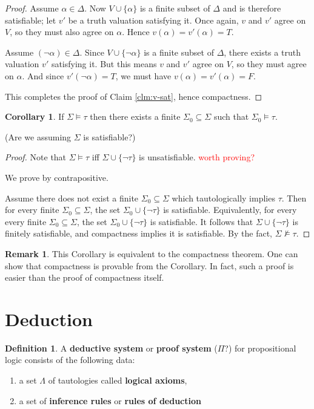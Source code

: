 \documentclass[12pt]{article}
\theoremstyle{definition}
\newtheorem{corollary}[theorem]{Corollary}
\newtheorem{definition}[theorem]{Definition}
\newtheorem{remark}[theorem]{Remark}
\newcommand{\<}{\langle}
\renewcommand{\>}{\rangle}
\newcommand{\seq}{\subseteq}
\newcommand{\keyword}{\textbf}
\begin{document}
\begin{proof}

    Assume $\alpha \in \Delta$.
    Now $V \cup \{\alpha\}$ is a finite subset of $\Delta$ and is therefore satisfiable; let $v'$ be a truth valuation satisfying it.
    Once again, $v$ and $v'$ agree on $V$, so they must also agree on $\alpha$.
    Hence $v(\alpha) = v'(\alpha) = T$.

    Assume $(\lnot\alpha) \in \Delta$.
    Since $V \cup \{\lnot\alpha\}$ is a finite subset of $\Delta$, there exists a truth valuation $v'$ satisfying it.
    But this means $v$ and $v'$ agree on $V$, so they must agree on $\alpha$.
    And since $v'(\lnot\alpha) = T$, we must have $v(\alpha) = v'(\alpha) = F$.

    This completes the proof of Claim \ref{clm:v-sat}, hence compactness.
\end{proof}


\begin{corollary}
    If $\Sigma \vDash \tau$ then there exists a finite $\Sigma_0 \seq \Sigma$ such that $\Sigma_0 \vDash \tau$.
\end{corollary}

(Are we assuming $\Sigma$ is satisfiable?)

\begin{proof}
    Note that $\Sigma \vDash \tau$ iff $\Sigma \cup \{\lnot\tau\}$ is unsatisfiable.
    \textcolor{red}{worth proving?}

    We prove by contrapositive.

    Assume there does not exist a finite $\Sigma_0 \seq \Sigma$ which tautologically implies $\tau$.
    Then for every finite $\Sigma_0 \seq \Sigma$, the set $\Sigma_0 \cup \{\lnot\tau\}$ is satisfiable.
    Equivalently, for every every finite $\Sigma_0 \seq \Sigma$, the set $\Sigma_0 \cup \{\lnot\tau\}$ is satisfiable.
    It follows that $\Sigma \cup \{\lnot\tau\}$ is finitely satisfiable, and compactness implies it is satisfiable.
    By the fact, $\Sigma \nvDash \tau$.
\end{proof}

\begin{remark}
    This Corollary is equivalent to the compactness theorem.
    One can show that compactness is provable from the Corollary.
    In fact, such a proof is easier than the proof of compactness itself.
\end{remark}

\section{Deduction}

\begin{definition}
    A \keyword{deductive system} or \keyword{proof system} ($\Pi$?) for propositional logic consists of the following data:
    \begin{enumerate}
        \item a set $\Lambda$ of tautologies called \keyword{logical axioms},
        \item a set of \keyword{inference rules} or \keyword{rules of deduction} 
    \end{enumerate}
\end{definition}
\end{document}
